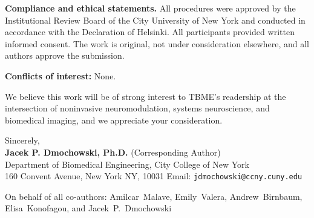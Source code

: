 \documentclass[11pt]{letter}
\begin{document}
\textbf{Compliance and ethical statements.} All procedures were approved by the Institutional Review Board of the City University of New York and conducted in accordance with the Declaration of Helsinki. All participants provided written informed consent. The work is original, not under consideration elsewhere, and all authors approve the submission. 

\textbf{Conflicts of interest:} None. 

We believe this work will be of strong interest to TBME’s readership at the intersection of noninvasive neuromodulation, systems neuroscience, and biomedical imaging, and we appreciate your consideration.

\vspace{1em}
\noindent Sincerely,\\[5.0em]
\textbf{Jacek P. Dmochowski, Ph.D.} (Corresponding Author)\\
Department of Biomedical Engineering, City College of New York\\
160 Convent Avenue, New York NY, 10031
Email: \texttt{jdmochowski@ccny.cuny.edu}

\vspace{0.5em}
\noindent On behalf of all co-authors: Amilcar~Malave, Emily~Valera, Andrew~Birnbaum, Elisa~Konofagou, and Jacek~P.~Dmochowski
\end{document}
